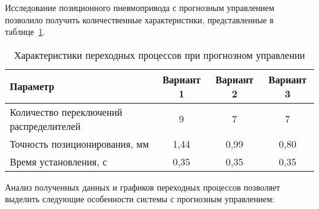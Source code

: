 Исследование позиционного пневмопривода с прогнозным управлением
позволило получить количественные характеристики, представленные в таблице~\ref{tab:transition_processes_mpc}.

\begin{table}[h]
	\centering
	\caption{Характеристики переходных процессов при прогнозном управлении}
	\label{tab:transition_processes_mpc}
	\small
	\begin{tabular}{lccc}
		\midrule
		\textbf{Параметр}                       & \textbf{Вариант 1} & \textbf{Вариант 2} & \textbf{Вариант 3} \\
		\midrule
		Количество переключений распределителей & 9                  & 7                  & 7                  \\
		Точность позиционирования, мм           & 1,44               & 0,99               & 0,80               \\
		Время установления, с                   & 0,35               & 0,35               & 0,35               \\
		\midrule
	\end{tabular}
\end{table}

Анализ полученных данных и графиков переходных процессов позволяет выделить следующие особенности системы с прогнозным управлением:

